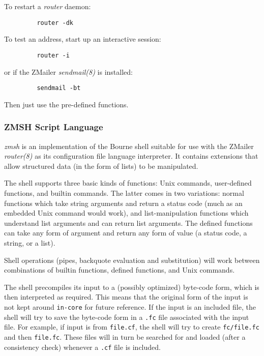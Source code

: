 To restart a {\em router\/} daemon: 
\begin{tscreen}
\begin{verbatim}
         router -dk
\end{verbatim}
\end{tscreen}


To test an address, start up an interactive session: 
\begin{tscreen}
\begin{verbatim}
         router -i
\end{verbatim}
\end{tscreen}


or if the ZMailer {\em sendmail(8)\/} is installed: 
\begin{tscreen}
\begin{verbatim}
         sendmail -bt
\end{verbatim}
\end{tscreen}


Then just use the pre-defined functions.




\subsubsection{ZMSH Script Language}



{\em zmsh\/} is an implementation of the Bourne shell 
suitable for use with the ZMailer {\em router(8)\/} as 
its configuration file language interpreter. It contains 
extensions that allow structured data (in the form of lists) 
to be manipulated. 

The shell supports three basic kinds of functions: Unix 
commands, user-defined functions, and builtin commands. 
The latter comes in two variations: normal functions which 
take string arguments and return a status code (much as an 
embedded Unix command would work), and list-manipulation 
functions which understand list arguments and can return 
list arguments. The defined functions can take any form 
of argument and return any form of value (a status code, 
a string, or a list). 

Shell operations (pipes, backquote evaluation and substitution) 
will work between combinations of builtin functions, 
defined functions, and Unix commands.

The shell precompiles its input to a (possibly optimized) 
byte-code form, which is then interpreted as required. 
This means that the original form of the input is not kept 
around {\tt in-core} for future reference. If the input 
is an included file, the shell will try to save the byte-code 
form in a {\tt .fc} file associated with the input file. 
For example, if input is from {\tt file.cf}, the shell 
will try to create {\tt fc/file.fc} and then {\tt file.fc}. 
These files will in turn be searched for and loaded 
(after a consistency check) whenever a {\tt .cf} file is included. 

